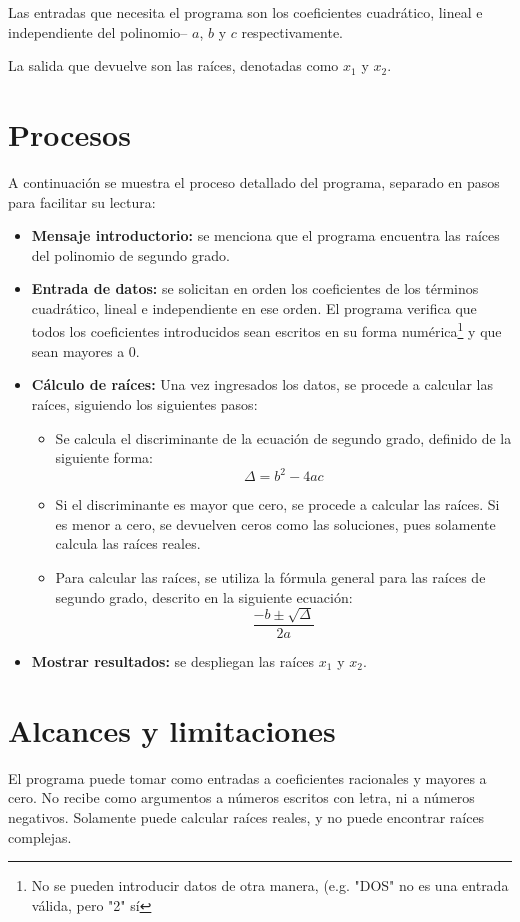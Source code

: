 \documentclass[conference]{IEEEtran}
\begin{document}
Las entradas que necesita el programa son los coeficientes cuadrático, lineal e independiente del polinomio– $a$, $b$ y $c$ respectivamente. 

La salida que devuelve son las raíces, denotadas como $x_1$ y $x_2$.

\section{Procesos}
A continuación se muestra el proceso detallado del programa, separado en pasos para facilitar su lectura:
\begin{itemize}
    \item \textbf{Mensaje introductorio:} se menciona que el programa encuentra las raíces del polinomio de segundo grado.
    \item \textbf{Entrada de datos:} se solicitan en orden los coeficientes de los términos cuadrático, lineal e independiente en ese orden. El programa verifica que todos los coeficientes introducidos sean escritos en su forma numérica\footnote{No se pueden introducir datos de otra manera, (e.g. "DOS" no es una entrada válida, pero "2" sí} y que sean mayores a 0.
    \item \textbf{Cálculo de raíces:} Una vez ingresados los datos, se procede a calcular las raíces, siguiendo los siguientes pasos:
    \begin{itemize}
        \item Se calcula el discriminante de la ecuación de segundo grado, definido de la siguiente forma: $$\Delta=b^2-4ac$$
        \item Si el discriminante es mayor que cero, se procede a calcular las raíces. Si es menor a cero, se devuelven ceros como las soluciones, pues solamente calcula las raíces reales.
        \item Para calcular las raíces, se utiliza la fórmula general para las raíces de segundo grado, descrito en la siguiente ecuación: $$\frac{-b\pm\sqrt{\Delta}}{2a}$$
    \end{itemize}
    \item \textbf{Mostrar resultados:} se despliegan las raíces $x_1$ y $x_2$.
\end{itemize}

\section{Alcances y limitaciones}
    El programa puede tomar como entradas a coeficientes racionales y mayores a cero. No recibe como argumentos a números escritos con letra, ni a números negativos. Solamente puede calcular raíces reales, y no puede encontrar raíces complejas. 
\end{document}
